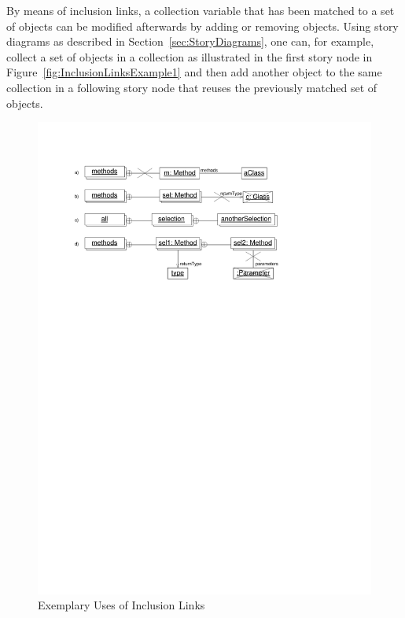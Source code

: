 By means of inclusion links, a collection variable that has been matched to a set of objects
can be modified afterwards by adding or removing objects.
Using story diagrams as described in Section~\ref{sec:StoryDiagrams},
one can, for example, collect a set of  objects in a collection 
as illustrated in the first story node in Figure~\ref{fig:InclusionLinksExample1}
and then add another  object to the same collection in a following story node that reuses the previously matched set of objects.

\begin{figure}[htb]
  \centering
  \includegraphics[scale=0.8]{figures/InclusionLinksExamples}
  \caption{Exemplary Uses of Inclusion Links}
  \label{fig:InlucionLinksExamples}
\end{figure}

